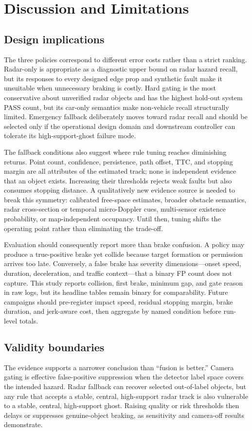 \documentclass[conference]{IEEEtran}
\begin{document}
\section{Discussion and Limitations}
\subsection{Design implications}
The three policies correspond to different error costs rather than a strict
ranking. Radar-only is appropriate as a diagnostic upper bound on radar hazard
recall, but its responses to every designed edge prop and synthetic fault make
it unsuitable when unnecessary braking is costly. Hard gating is the most
conservative about unverified radar objects and has the highest hold-out system
PASS count, but its car-only semantics make non-vehicle recall structurally
limited. Emergency fallback deliberately moves toward radar recall and should be
selected only if the operational design domain and downstream controller can
tolerate its high-support-ghost failure mode.

The fallback conditions also suggest where rule tuning reaches diminishing
returns. Point count, confidence, persistence, path offset, TTC, and stopping
margin are all attributes of the estimated track; none is independent evidence
that an object exists. Increasing their thresholds rejects weak faults but also
consumes stopping distance. A qualitatively new evidence source is needed to
break this symmetry: calibrated free-space estimates, broader obstacle
semantics, radar cross-section or temporal micro-Doppler cues, multi-sensor
existence probability, or map-independent occupancy. Until then, tuning shifts
the operating point rather than eliminating the trade-off.

Evaluation should consequently report more than brake confusion. A policy may
produce a true-positive brake yet collide because target formation or permission
arrives too late. Conversely, a false brake has severity dimensions---onset
speed, duration, deceleration, and traffic context---that a binary FP count does
not capture. This study reports collision, first brake, minimum gap, and gate
reason in raw logs, but its headline tables remain binary for comparability.
Future campaigns should pre-register impact speed, residual stopping margin,
brake duration, and jerk-aware cost, then aggregate by named condition before
run-level totals.

\subsection{Validity boundaries}
The evidence supports a narrower conclusion than ``fusion is better.'' Camera
gating is effective false-positive suppression when the detector label space
covers the intended hazard. Radar fallback can recover selected out-of-label
objects, but any rule that accepts a stable, central, high-support radar track is
also vulnerable to a stable, central, high-support ghost. Raising quality or
risk thresholds then delays or suppresses genuine-object braking, as sensitivity
and camera-off results demonstrate.
\end{document}
